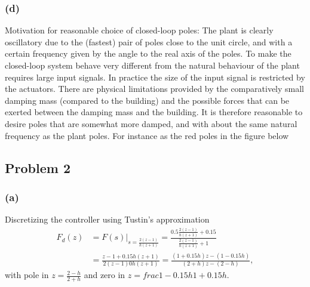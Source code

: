 \documentclass[letterpaper,11pt]{article}
\begin{document}
\subsubsection*{(d)}
Motivation for reasonable choice of closed-loop poles: The plant is clearly oscillatory due to the (fastest) pair of poles close to the unit circle, and with a certain frequency given by the angle to the real axis of the poles. To make the closed-loop system  behave very different from the natural behaviour of the plant requires large input signals. In practice the size of the input signal is restricted by the actuators. There are physical limitations provided by the comparatively small damping mass (compared to the building) and the possible forces that can be exerted between the damping mass and the building. It is therefore reasonable to desire poles that are somewhat more damped, and with about the same natural frequency as the plant poles. For instance as the red poles in the figure below 
\begin{center}
\end{center}

\subsection*{Problem 2}

\subsubsection*{(a)}

Discretizing the controller using Tustin's approximation
\begin{equation*}
  \begin{split}
    F_d(z) &= F(s)|_{s=\frac{2(z-1)}{h(z+1)}} = \frac{0.5\frac{2(z-1)}{h(z+1)} + 0.15}{\frac{2(z-1)}{h(z+1)} + 1}\\
    &= \frac{ z-1 + 0.15h(z+1)}{2(z-1) 0 h(z+1)} = \frac{(1+0.15h)z - (1 - 0.15h)}{(2+h)z - (2-h)},
  \end{split}
\end{equation*}
with pole in \(z = \frac{2-h}{2+h}\) and zero in \(z=frac{1-0.15h}{1+0.15h}\).
\end{document}
